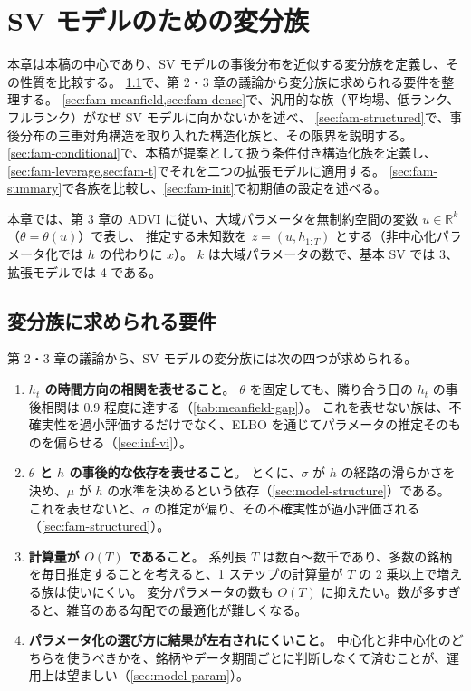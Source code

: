 \section{SV モデルのための変分族}\label{sec:family}

本章は本稿の中心であり、SV モデルの事後分布を近似する変分族を定義し、その性質を比較する。
\cref{sec:fam-requirements}で、第 2・3 章の議論から変分族に求められる要件を整理する。
\cref{sec:fam-meanfield,sec:fam-dense}で、汎用的な族（平均場、低ランク、フルランク）がなぜ SV モデルに向かないかを述べ、
\cref{sec:fam-structured}で、事後分布の三重対角構造を取り入れた構造化族と、その限界を説明する。
\cref{sec:fam-conditional}で、本稿が提案として扱う条件付き構造化族を定義し、
\cref{sec:fam-leverage,sec:fam-t}でそれを二つの拡張モデルに適用する。
\cref{sec:fam-summary}で各族を比較し、\cref{sec:fam-init}で初期値の設定を述べる。

本章では、第 3 章の ADVI に従い、大域パラメータを無制約空間の変数 $u \in \mathbb{R}^k$（$\theta = \theta(u)$）で表し、
推定する未知数を $z = (u, h_{1:T})$ とする（非中心化パラメータ化では $h$ の代わりに $x$）。
$k$ は大域パラメータの数で、基本 SV では 3、拡張モデルでは 4 である。

\subsection{変分族に求められる要件}\label{sec:fam-requirements}

第 2・3 章の議論から、SV モデルの変分族には次の四つが求められる。

\begin{enumerate}[label=(R\arabic*)]
  \item \textbf{$h_t$ の時間方向の相関を表せること}。
    $\theta$ を固定しても、隣り合う日の $h_t$ の事後相関は 0.9 程度に達する（\cref{tab:meanfield-gap}）。
    これを表せない族は、不確実性を過小評価するだけでなく、ELBO を通じてパラメータの推定そのものを偏らせる（\cref{sec:inf-vi}）。
  \item \textbf{$\theta$ と $h$ の事後的な依存を表せること}。
    とくに、$\sigma$ が $h$ の経路の滑らかさを決め、$\mu$ が $h$ の水準を決めるという依存（\cref{sec:model-structure}）である。
    これを表せないと、$\sigma$ の推定が偏り、その不確実性が過小評価される（\cref{sec:fam-structured}）。
  \item \textbf{計算量が $O(T)$ であること}。
    系列長 $T$ は数百〜数千であり、多数の銘柄を毎日推定することを考えると、1 ステップの計算量が $T$ の 2 乗以上で増える族は使いにくい。
    変分パラメータの数も $O(T)$ に抑えたい。数が多すぎると、雑音のある勾配での最適化が難しくなる。
  \item \textbf{パラメータ化の選び方に結果が左右されにくいこと}。
    中心化と非中心化のどちらを使うべきかを、銘柄やデータ期間ごとに判断しなくて済むことが、運用上は望ましい（\cref{sec:model-param}）。
\end{enumerate}

